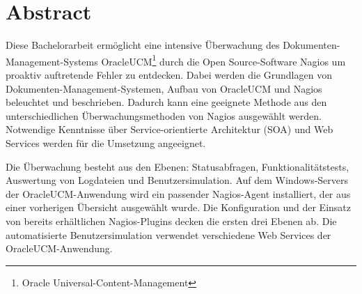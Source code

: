 \section{Abstract}

Diese Bachelorarbeit ermöglicht eine intensive Überwachung des Dokumenten-Management-Systems \gls{OracleUCM}\footnote{Oracle Universal-Content-Management} durch die Open Source-Software Nagios um proaktiv auftretende Fehler zu entdecken.
Dabei werden die Grundlagen von Dokumenten-Management-Systemen, Aufbau von \gls{OracleUCM} und Nagios beleuchtet und beschrieben.
Dadurch kann eine geeignete Methode aus den unterschiedlichen Überwachungsmethoden von Nagios ausgewählt werden.
Notwendige Kenntnisse über Service-orientierte Architektur (\gls{SOA}) und Web Services werden für die Umsetzung angeeignet.

Die Überwachung besteht aus den Ebenen: Statusabfragen, Funktionalitätstests, Auswertung von Logdateien und Benutzersimulation.
Auf dem Windows-Servers der \gls{OracleUCM}-Anwendung wird ein passender Nagios-Agent installiert, der aus einer vorherigen Übersicht ausgewählt wurde.
Die Konfiguration und der Einsatz von bereits erhältlichen Nagios-Plugins decken die ersten drei Ebenen ab.
Die automatisierte Benutzersimulation verwendet verschiedene Web Services der \gls{OracleUCM}-Anwendung.





